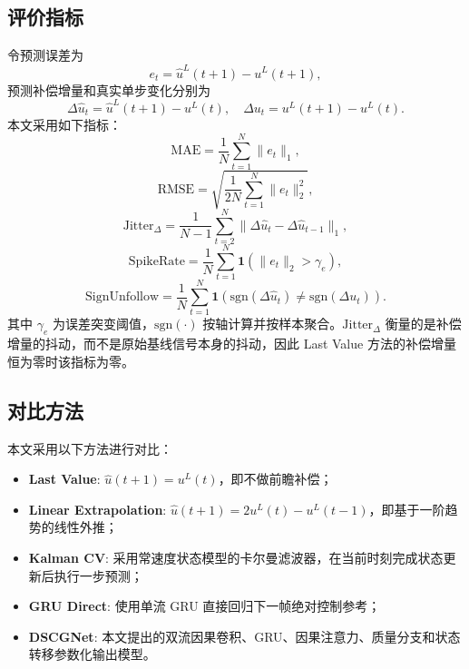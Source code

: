 \documentclass[journal]{IEEEtran}
\begin{document}
\subsection{评价指标}
令预测误差为
\begin{equation}
e_t=\hat{u}^L(t+1)-u^L(t+1),
\end{equation}
预测补偿增量和真实单步变化分别为
\begin{equation}
\Delta\hat{u}_t=\hat{u}^L(t+1)-u^L(t),\quad \Delta u_t=u^L(t+1)-u^L(t).
\end{equation}
本文采用如下指标：
\begin{equation}
\mathrm{MAE}=\frac{1}{N}\sum_{t=1}^{N}\|e_t\|_1,
\end{equation}
\begin{equation}
\mathrm{RMSE}=\sqrt{\frac{1}{2N}\sum_{t=1}^{N}\|e_t\|_2^2},
\end{equation}
\begin{equation}
\mathrm{Jitter}_{\Delta}=\frac{1}{N-1}\sum_{t=2}^{N}\|\Delta\hat{u}_t-\Delta\hat{u}_{t-1}\|_1,
\end{equation}
\begin{equation}
\mathrm{SpikeRate}=\frac{1}{N}\sum_{t=1}^{N}\mathbf{1}(\|e_t\|_2>\gamma_e),
\end{equation}
\begin{equation}
\mathrm{SignUnfollow}=\frac{1}{N}\sum_{t=1}^{N}\mathbf{1}\left(\mathrm{sgn}(\Delta\hat{u}_t)\neq \mathrm{sgn}(\Delta u_t)\right).
\end{equation}
其中 $\gamma_e$ 为误差突变阈值，$\mathrm{sgn}(\cdot)$ 按轴计算并按样本聚合。$\mathrm{Jitter}_{\Delta}$ 衡量的是补偿增量的抖动，而不是原始基线信号本身的抖动，因此 Last Value 方法的补偿增量恒为零时该指标为零。

\subsection{对比方法}
本文采用以下方法进行对比：
\begin{itemize}
    \item \textbf{Last Value}: $\hat{u}(t+1)=u^L(t)$，即不做前瞻补偿；
    \item \textbf{Linear Extrapolation}: $\hat{u}(t+1)=2u^L(t)-u^L(t-1)$，即基于一阶趋势的线性外推；
    \item \textbf{Kalman CV}: 采用常速度状态模型的卡尔曼滤波器，在当前时刻完成状态更新后执行一步预测；
    \item \textbf{GRU Direct}: 使用单流 GRU 直接回归下一帧绝对控制参考；
    \item \textbf{DSCGNet}: 本文提出的双流因果卷积、GRU、因果注意力、质量分支和状态转移参数化输出模型。
\end{itemize}
\end{document}
